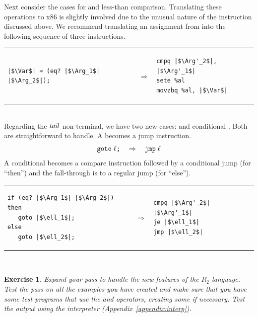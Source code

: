 \documentclass[11pt]{book}
\newtheorem{exercise}[theorem]{Exercise}
\begin{document}
Next consider the cases for  and less-than comparison.
Translating these operations to x86 is slightly involved due to the
unusual nature of the  instruction discussed above.  We
recommend translating an assignment from  into the following
sequence of three instructions. \\
\begin{tabular}{lll}
\begin{minipage}{0.4\textwidth}
\begin{lstlisting}
|$\Var$| = (eq? |$\Arg_1$| |$\Arg_2$|);
\end{lstlisting}
\end{minipage}
&
$\Rightarrow$
&
\begin{minipage}{0.4\textwidth}
\begin{lstlisting}
cmpq |$\Arg'_2$|, |$\Arg'_1$|
sete %al
movzbq %al, |$\Var$|
\end{lstlisting}
\end{minipage}
\end{tabular}  \\

Regarding the $\mathit{tail}$ non-terminal, we have two new cases: 
and conditional . Both are straightforward to handle. A
 becomes a jump instruction.
\[
\texttt{goto}\; \ell\texttt{;} \quad \Rightarrow \quad \texttt{jmp}\;\ell
\]
A conditional  becomes a compare instruction followed
by a conditional jump (for ``then'') and the fall-through is
to a regular jump (for ``else'').\\
\begin{tabular}{lll}
\begin{minipage}{0.4\textwidth}
\begin{lstlisting}
if (eq? |$\Arg_1$| |$\Arg_2$|) then
   goto |$\ell_1$|;
else
   goto |$\ell_2$|;
\end{lstlisting}
\end{minipage}
&
$\Rightarrow$
&
\begin{minipage}{0.4\textwidth}
\begin{lstlisting}
cmpq |$\Arg'_2$| |$\Arg'_1$|
je |$\ell_1$|
jmp |$\ell_2$|
\end{lstlisting}
\end{minipage}
\end{tabular}  \\

\begin{exercise}\normalfont
Expand your  pass to handle the new features
of the $R_2$ language. Test the pass on all the examples you have
created and make sure that you have some test programs that use the
 and \code{<} operators, creating some if necessary. Test
the output using the  interpreter
(Appendix~\ref{appendix:interp}).
\end{exercise}
\end{document}
